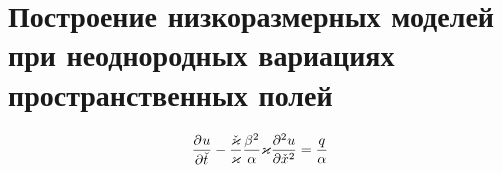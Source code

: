 \chapter{Построение низкоразмерных моделей при неоднородных вариациях пространственных полей}\label{ch:ch4}


\cite{Elizarev_2021}

\begin{align}
    \deriv{u}{\check{t}}
    - \frac{\check{\varkappa}}{\varkappa}
    \frac{\beta^2}{\alpha}  \varkappa \deriv[2]{u}{\check{x}} = \frac{q}{\alpha}
\end{align}
